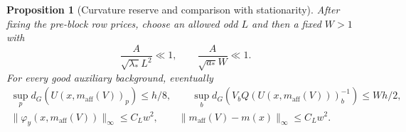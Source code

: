 \documentclass[11pt,reqno]{amsart}
\numberwithin{equation}{section}
\newtheorem{proposition}[theorem]{Proposition}
\theoremstyle{definition}
\theoremstyle{remark}
\begin{document}
\begin{proposition}[Curvature reserve and comparison with stationarity]
\label{prop:general-central-good-centre}
After fixing the pre-block row prices, choose an allowed odd \(L\)
and then a fixed \(W>1\) with
\[
       \frac{A}{\sqrt{\lambda_*}L^2}\ll1,\qquad
       \frac{A}{\sqrt{a_*}W}\ll1.
\]
For every good auxiliary background, eventually
\begin{gather}
 \sup_p d_G(U(x,m_{\mathrm{aff}}(V))_p)\le h/8,\qquad
 \sup_b d_G(V_bQ(U(x,m_{\mathrm{aff}}(V)))_b^{-1})\le Wh/2,
 \label{eq:general-central-affine-reserve}\\
 \|\varphi_y(x,m_{\mathrm{aff}}(V))\|_\infty\le C_Lw^2,\qquad
                         \|m_{\mathrm{aff}}(V)-m(x)\|_\infty\le C_Lw^2.
 \label{eq:general-central-stationary-residual}
\end{gather}
\end{proposition}
\end{document}
